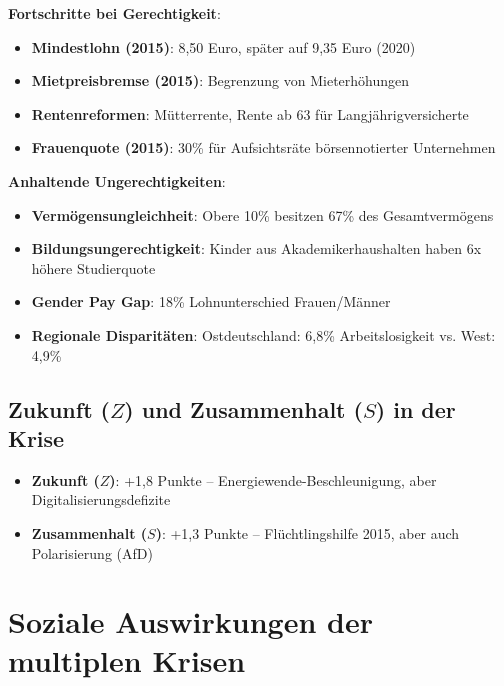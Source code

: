 \textbf{Fortschritte bei Gerechtigkeit}:

\begin{itemize}
    \item \textbf{Mindestlohn (2015)}: 8,50 Euro, später auf 9,35 Euro (2020)
    \item \textbf{Mietpreisbremse (2015)}: Begrenzung von Mieterhöhungen
    \item \textbf{Rentenreformen}: Mütterrente, Rente ab 63 für Langjährigversicherte
    \item \textbf{Frauenquote (2015)}: 30\% für Aufsichtsräte börsennotierter Unternehmen
\end{itemize}

\textbf{Anhaltende Ungerechtigkeiten}:

\begin{itemize}
    \item \textbf{Vermögensungleichheit}: Obere 10\% besitzen 67\% des Gesamtvermögens
    \item \textbf{Bildungsungerechtigkeit}: Kinder aus Akademikerhaushalten haben 6x höhere Studierquote
    \item \textbf{Gender Pay Gap}: 18\% Lohnunterschied Frauen/Männer
    \item \textbf{Regionale Disparitäten}: Ostdeutschland: 6,8\% Arbeitslosigkeit vs. West: 4,9\%
\end{itemize}

\subsection{Zukunft (\(Z\)) und Zusammenhalt (\(S\)) in der Krise}

\begin{itemize}
    \item \textbf{Zukunft (\(Z\))}: +1,8 Punkte – Energiewende-Beschleunigung, aber Digitalisierungsdefizite
    \item \textbf{Zusammenhalt (\(S\))}: +1,3 Punkte – Flüchtlingshilfe 2015, aber auch Polarisierung (AfD)
\end{itemize}

\section{Soziale Auswirkungen der multiplen Krisen}

